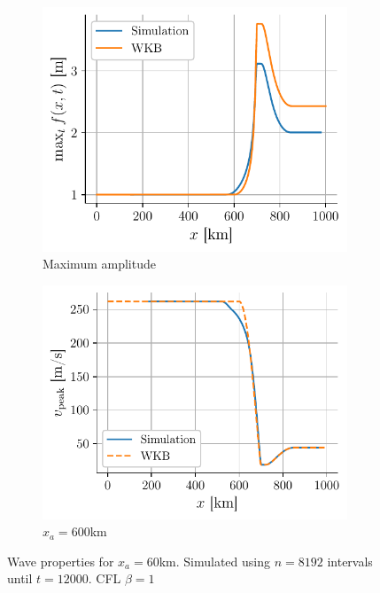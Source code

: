 \begin{figure}[H]
    \centering
    \begin{subfigure}{0.48\linewidth}
        \centering
        \includegraphics[width=\linewidth]{figures/corail_eq1_amplitude_xa=600000.0.pdf}
        \caption{Maximum amplitude}
        \label{fig:corail_eq1_amplitude_xa=60km}
    \end{subfigure}
    \begin{subfigure}{0.48\linewidth}
        \centering
        \includegraphics[width=\linewidth]{figures/corail_eq1_vitesse_xa=600000.0.pdf}
        \caption{\(x_a = 600\)km}
        \label{fig:corail_eq1_speed_xa=60km}
    \end{subfigure}
    \caption{Wave properties for \(x_a = 60\)km. Simulated using \(n=8192\) intervals until \(t=12000\). CFL \(\beta=1\)}
\end{figure}

